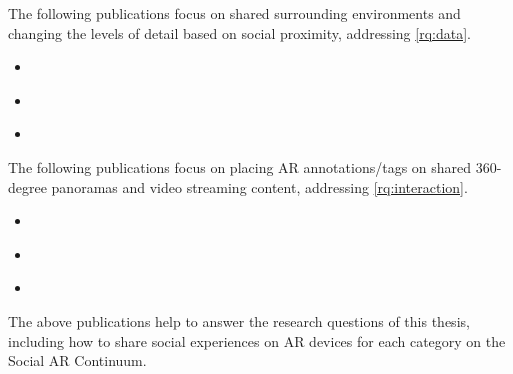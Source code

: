 The following publications focus on shared surrounding environments and changing the levels of detail based on social proximity, addressing \ref{rq:data}.

\begin{itemize}
    \item{ }
    \item{ }
    \item{ }
\end{itemize}


The following publications focus on placing AR annotations/tags on shared 360-degree panoramas and video streaming content, addressing \ref{rq:interaction}.

\begin{itemize}
    \item{ }
    \item{ }
    \item{ }
\end{itemize}
The above publications help to answer the research questions of this thesis, including how to share social experiences on AR devices for each category on the Social AR Continuum. 

